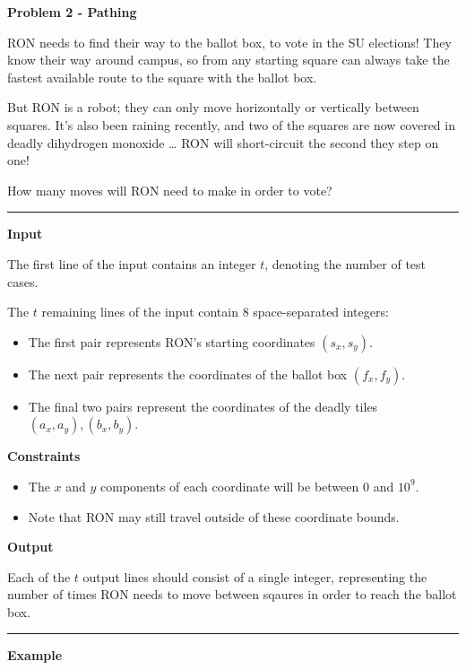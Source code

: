 \LARGE \textbf{Problem 2 - Pathing} \normalsize

RON needs to find their way to the ballot box, to vote in the SU elections!
They know their way around campus, so from any starting square can always take the fastest available route to the square with the ballot box.

But RON is a robot; they can only move horizontally or vertically between squares.
It's also been raining recently, and two of the squares are now covered in deadly dihydrogen monoxide \dots
RON will short-circuit the second they step on one! 

How many moves will RON need to make in order to vote?

\vspace{8pt}
\hrule

\textbf{Input}

The first line of the input contains an integer $t$, denoting the number of test cases.

The $t$ remaining lines of the input contain 8 space-separated integers:
\begin{itemize}
    \item The first pair represents RON's starting coordinates $(s_x, s_y)$.
    \item The next pair represents the coordinates of the ballot box $(f_x, f_y)$.
    \item The final two pairs represent the coordinates of the deadly tiles $(a_x, a_y), (b_x, b_y)$.
\end{itemize}

\textbf{Constraints}

\begin{itemize}
    \item The $x$ and $y$ components of each coordinate will be between $0$ and $10^9$.
    \item Note that RON may still travel outside of these coordinate bounds.
\end{itemize}

\textbf{Output}

Each of the $t$ output lines should consist of a single integer, 
representing the number of times RON needs to move between sqaures in order to reach the ballot box.

\vspace{8pt}
\hrule

\textbf{Example}

